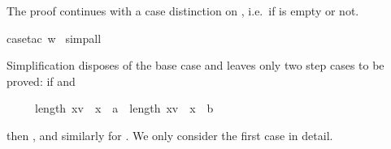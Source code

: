\begin{isabellebody}
\begin{isamarkuptxt}
The proof continues with a case distinction on ,
i.e.\ if  is empty or not.%
\end{isamarkuptxt}%
case{\isacharunderscore}tac\ w{\isacharparenright}\isanewline
\ simp{\isacharunderscore}all{\isacharparenright}%
\begin{isamarkuptxt}%
\noindent
Simplification disposes of the base case and leaves only two step
cases to be proved:
if  and \begin{isabelle}%
\ \ \ \ \ length\ {\isacharbrackleft}x{\isasymin}v\ {\isachardot}\ x\ {\isacharequal}\ a{\isacharbrackright}\ {\isacharequal}\ length\ {\isacharbrackleft}x{\isasymin}v\ {\isachardot}\ x\ {\isacharequal}\ b{\isacharbrackright}\ {\isacharplus}\ {}%
\end{isabelle} then
, and similarly for .
We only consider the first case in detail.


\end{isamarkuptxt}
\end{isabellebody}
